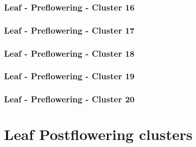 \subsubsection{Leaf - Preflowering - Cluster 16}

\vspace{1em}



\clearpage

\subsubsection{Leaf - Preflowering - Cluster 17}

\vspace{1em}



\clearpage

\subsubsection{Leaf - Preflowering - Cluster 18}

\vspace{1em}



\clearpage

\subsubsection{Leaf - Preflowering - Cluster 19}

\vspace{1em}



\clearpage

\subsubsection{Leaf - Preflowering - Cluster 20}

\vspace{1em}



\clearpage

\section{Leaf Postflowering clusters}

